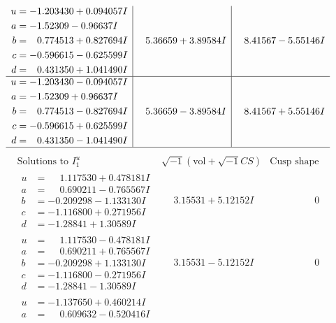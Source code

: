 \documentclass[1p]{elsarticle_modified}
\theoremstyle{definition}
\newcommand{\I}{\sqrt{-1}}
\begin{document}
$$\begin{array}{c|c|c}
\begin{aligned}
u &= -1.203430 + 0.094057 I \\
a &= -1.52309 - 0.96637 I \\
b &= \phantom{-}0.774513 + 0.827694 I \\
c &= -0.596615 - 0.625599 I \\
d &= \phantom{-}0.431350 + 1.041490 I\end{aligned}
 & \phantom{-}5.36659 + 3.89584 I & \phantom{-}8.41567 - 5.55146 I \\ \hline\begin{aligned}
u &= -1.203430 - 0.094057 I \\
a &= -1.52309 + 0.96637 I \\
b &= \phantom{-}0.774513 - 0.827694 I \\
c &= -0.596615 + 0.625599 I \\
d &= \phantom{-}0.431350 - 1.041490 I\end{aligned}
 & \phantom{-}5.36659 - 3.89584 I & \phantom{-}8.41567 + 5.55146 I\\
 \hline 
 \end{array}$$\newpage$$\begin{array}{c|c|c}  
\text{Solutions to }I^u_{1}& \I (\text{vol} + \sqrt{-1}CS) & \text{Cusp shape}\\
 \hline 
\begin{aligned}
u &= \phantom{-}1.117530 + 0.478181 I \\
a &= \phantom{-}0.690211 - 0.765567 I \\
b &= -0.209298 - 1.133130 I \\
c &= -1.116800 + 0.271956 I \\
d &= -1.28841 + 1.30589 I\end{aligned}
 & \phantom{-}3.15531 + 5.12152 I & \phantom{-0.000000 } 0 \\ \hline\begin{aligned}
u &= \phantom{-}1.117530 - 0.478181 I \\
a &= \phantom{-}0.690211 + 0.765567 I \\
b &= -0.209298 + 1.133130 I \\
c &= -1.116800 - 0.271956 I \\
d &= -1.28841 - 1.30589 I\end{aligned}
 & \phantom{-}3.15531 - 5.12152 I & \phantom{-0.000000 } 0 \\ \hline\begin{aligned}
u &= -1.137650 + 0.460214 I \\
a &= \phantom{-}0.609632 - 0.520416 I \\

\end{aligned}
\end{array}$$
\end{document}

